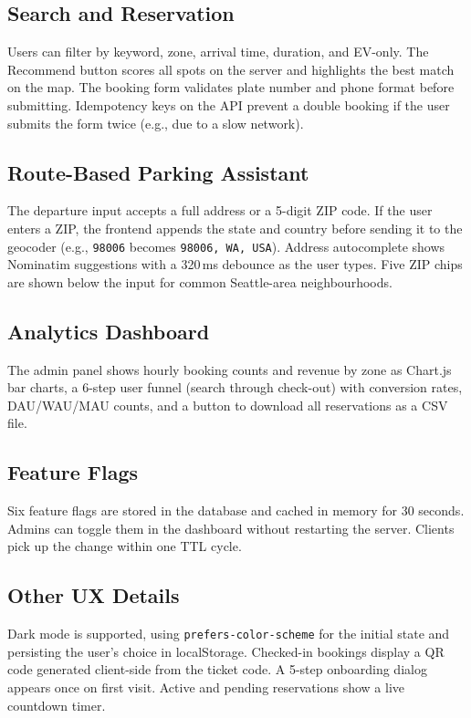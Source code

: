 \documentclass[11pt,letterpaper]{article}
\begin{document}
\subsection{Search and Reservation}
Users can filter by keyword, zone, arrival time, duration, and EV-only.
The Recommend button scores all spots on the server and highlights the
best match on the map. The booking form validates plate number and phone
format before submitting. Idempotency keys on the API prevent a double
booking if the user submits the form twice (e.g., due to a slow network).

\subsection{Route-Based Parking Assistant}
The departure input accepts a full address or a 5-digit ZIP code.
If the user enters a ZIP, the frontend appends the state and country
before sending it to the geocoder (e.g., \texttt{98006} becomes
\texttt{98006, WA, USA}). Address autocomplete shows Nominatim suggestions
with a 320\,ms debounce as the user types. Five ZIP chips are shown below
the input for common Seattle-area neighbourhoods.

\subsection{Analytics Dashboard}
The admin panel shows hourly booking counts and revenue by zone as Chart.js
bar charts, a 6-step user funnel (search through check-out) with conversion
rates, DAU/WAU/MAU counts, and a button to download all reservations as a
CSV file.

\subsection{Feature Flags}
Six feature flags are stored in the database and cached in memory for
30 seconds. Admins can toggle them in the dashboard without restarting
the server. Clients pick up the change within one TTL cycle.

\subsection{Other UX Details}
Dark mode is supported, using \texttt{prefers-color-scheme} for the
initial state and persisting the user's choice in localStorage.
Checked-in bookings display a QR code generated client-side from the
ticket code. A 5-step onboarding dialog appears once on first visit.
Active and pending reservations show a live countdown timer.
\end{document}
